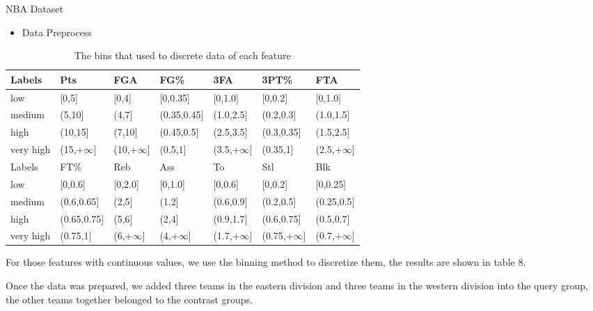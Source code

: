 \documentclass[
size=14pt,
paper=smartboard,  %
mode=present, 		%
display=slides, 	%
style=tuliplab,  	%
pauseslide,
fleqn,leqno]{powerdot}
\begin{document}
\begin{slide}[toc=,bm=]{NBA Dataset}
	\begin{itemize}
		\item Data Preprocess
	\end{itemize}
	
	\begin{table}
		\setlength{\abovecaptionskip}{0pt}
		\setlength{\belowcaptionskip}{10pt}
		\centering
		\caption{The bins that used to discrete data of each feature}
		
		\begin{tabular}{p{2.5cm}p{2cm}p{1.8cm}p{2cm}p{1.8cm}p{1.8cm}p{1.8cm}}
			\hline
			Labels & Pts & FGA & FG\% & 3FA & 3PT\% & FTA  \\
			\hline
			low &  [0,5]& [0,4] & [0,0.35] & [0,1.0] & [0,0.2] & [0,1.0] \\
			medium& (5,10]& (4,7] & (0.35,0.45] & (1.0,2.5]& (0.2,0.3] & (1.0,1.5] \\
			high &  (10,15] & (7,10] & (0.45,0.5] & (2.5,3.5]& (0.3,0.35]& (1.5,2.5] \\
			very high&(15,$+\infty$]& (10,$+\infty$] & (0.5,1] & (3.5,$+\infty$] & (0.35,1] & (2.5,$+\infty$] \\
			\hline
			Labels & FT\% & Reb & Ass & To & Stl & Blk \\
			\hline
			low   & [0,0.6] & [0,2.0] & [0,1.0] & [0,0.6] & [0,0.2] & [0,0.25] \\
			medium& (0.6,0.65]& (2,5] & (1,2] & (0.6,0.9] & (0.2,0.5] & (0.25,0.5] \\
			high  & (0.65,0.75] & (5,6] & (2,4] & (0.9,1.7] & (0.6,0.75] & (0.5,0.7] \\
			very high& (0.75,1] & (6,$+\infty$] & (4,$+\infty$] & (1.7,$+\infty$] & (0.75,$+\infty$] & (0.7,$+\infty$]\\
			\hline
		\end{tabular}
	\end{table}
	
	\begin{note}
		For those features with continuous values,
		we use the binning method to discretize them,
		the results are shown in table $8$.
		
		Once the data was prepared,
		we added three teams in the eastern division
		and three teams in the western division into the query group,
		the other teams together belonged to the contrast groups.
	\end{note}
	
\end{slide}
\end{document}
